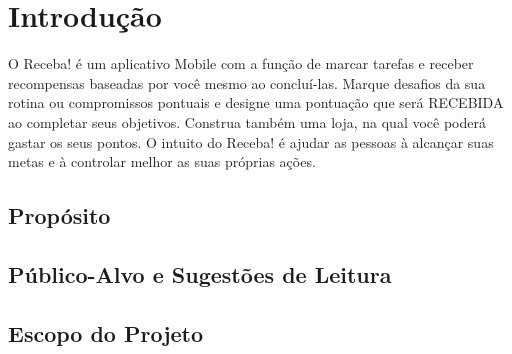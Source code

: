 
\chapter{Introdução}
O Receba! é um aplicativo Mobile com a função de marcar tarefas e receber recompensas baseadas por você mesmo ao concluí-las. Marque desafios da sua rotina ou compromissos pontuais e designe uma pontuação que será RECEBIDA ao completar seus objetivos. Construa também uma loja, na qual você poderá gastar os seus pontos. O intuito do Receba! é ajudar as pessoas à alcançar suas metas e à controlar melhor as suas próprias ações.

\section{Propósito}

\section{Público-Alvo e Sugestões de Leitura}

\section{Escopo do Projeto}